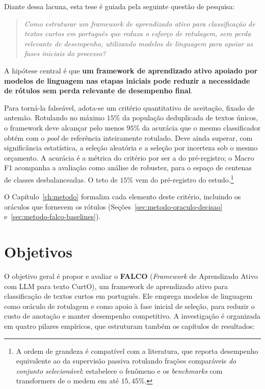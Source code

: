 Diante dessa lacuna, esta tese é guiada pela seguinte questão de pesquisa:

\begin{quote}
\textit{Como estruturar um framework de aprendizado ativo para classificação de
textos curtos em português que reduza o esforço de rotulagem, sem perda relevante de
desempenho, utilizando modelos de linguagem para apoiar as fases iniciais do
processo?}
\end{quote}

A hipótese central é que \textbf{um framework de aprendizado ativo apoiado por
modelos de linguagem nas etapas iniciais pode reduzir a necessidade de rótulos sem
perda relevante de desempenho final}.

Para torná-la falseável, adota-se um critério quantitativo de aceitação, fixado
de antemão. Rotulando no máximo $15\%$ da população deduplicada de textos únicos,
o framework deve alcançar pelo menos $95\%$ da acurácia que o mesmo classificador
obtém com o \textit{pool} de referência inteiramente rotulado. Deve ainda superar,
com significância estatística, a seleção aleatória e a seleção por incerteza sob o
mesmo orçamento. A acurácia é a métrica do critério por ser a do pré-registro; o
Macro F1 acompanha a avaliação como análise de robustez, para o espaço de
centenas de classes desbalanceadas. O teto de $15\%$ vem do pré-registro do
estudo.\footnote{A ordem de grandeza é compatível com a literatura, que reporta
desempenho equivalente ao da supervisão passiva rotulando frações comparáveis
\emph{do conjunto selecionável}: \citet{Settles2009} estabelece o fenômeno e os
\textit{benchmarks} com transformers de \citet[Tab.~3]{Schroder2022Uncertainty}
o medem em até $15{,}45\%$.}

O Capítulo~\ref{ch:metodo} formaliza cada elemento deste critério, incluindo os
oráculos que fornecem os rótulos (Seções~\ref{sec:metodo-oraculo-decisao}
e~\ref{sec:metodo-falco-baselines}).

\section{Objetivos}
\label{sec:intro-objetivos}

O objetivo geral é propor e avaliar o \textbf{FALCO} (\textit{Framework} de
Aprendizado Ativo com LLM para texto CurtO), um framework de aprendizado
ativo para classificação de textos curtos em português. Ele emprega modelos de
linguagem como oráculo de rotulagem e como apoio à fase inicial de seleção, para
reduzir o custo de anotação e manter desempenho competitivo. A investigação é
organizada em quatro pilares empíricos, que estruturam também os capítulos de
resultados:

